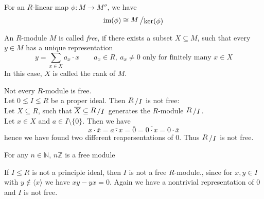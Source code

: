 \documentclass[12pt]{book}
\newcommand{\slant}[2]{{\raisebox{.1em}{$#1$}\left/\raisebox{-.1em}{$#2$}\right.}}
\begin{document}
\begin{spacing}{1.3}
\begin{compactenum}
\item For an $R$-linear map $\phi: M \longrightarrow M''$, we have
$$ \textrm{im}(\phi) \cong \slant {M}{\ker(\phi)}$$
\item An $R$-module $M$ is called \textit{free}, if there exists a subset $X \subseteq M$, such that every $y \in M$ has a unique representation
$$y = \sum_{x \in X} a_x \cdot x \qquad a_x \in R, \ a_x\neq0 \textrm{ only for finitely many } x \in X$$
In this case, $X$ is called the rank of $M$.
\item Not every $R$-module is free. \\
Let $0 \lneq I \lneq R$ be a proper ideal. Then $\slant{R}{I}$ is not free:\\
Let $X \subseteq R$, such that $\overline{X} \subseteq \slant{R}{I}$ generates the $R$-module $\slant{R}{I}$. \\
Let $x \in X$ and $a\in I \setminus \{0\}$. Then we have
$$x \cdot \overline{x} = \overline{a \cdot x}=\overline{0}=\overline{0\cdot x}= 0 \cdot \overline{x}$$
hence we have found two different reapersentations of $0$. Thus $\slant{R}{I}$ is not free.
\item For any $n \in \mathbb{N}$, $n\mathbb{Z}$ is a free module
\item If $I \leqslant R$ is not a principle ideal, then $I$ is not a free $R$-module., since for $x,y \in I$ with $y \notin \langle x \rangle$ we have $xy-yx=0$. Again we have a nontrivial representation of $0$ and $I$ is not free.
\end{compactenum}


\end{spacing}
\end{document}
